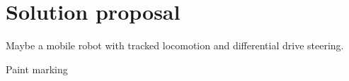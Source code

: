 \chapter{Solution proposal}

Maybe a mobile robot with tracked locomotion and differential drive steering.

Paint marking 